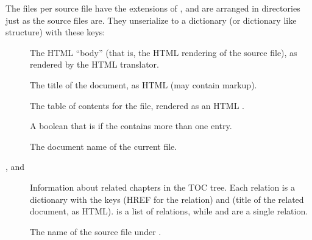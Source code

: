 \documentclass[letterpaper,10pt,english]{sphinxmanual}
\begin{document}
The files per source file have the extensions of
{\hyperref[builders:sphinx.builders.html.SerializingHTMLBuilder.out_suffix]{}}, and are arranged in directories
just as the source files are.  They unserialize to a dictionary (or dictionary
like structure) with these keys:
\begin{description}
\item[{}] \leavevmode
The HTML ``body'' (that is, the HTML rendering of the source file), as rendered
by the HTML translator.

\item[{}] \leavevmode
The title of the document, as HTML (may contain markup).

\item[{}] \leavevmode
The table of contents for the file, rendered as an HTML .

\item[{}] \leavevmode
A boolean that is  if the  contains more than one entry.

\item[{}] \leavevmode
The document name of the current file.

\item[{,  and }] \leavevmode
Information about related chapters in the TOC tree.  Each relation is a
dictionary with the keys  (HREF for the relation) and 
(title of the related document, as HTML).   is a list of
relations, while  and  are a single relation.

\item[{}] \leavevmode
The name of the source file under .

\end{description}
\end{document}
